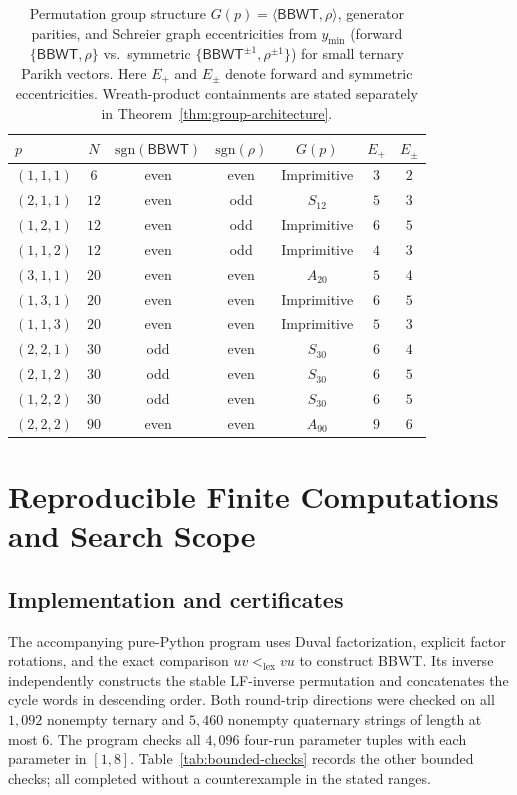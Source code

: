 \documentclass[11pt,a4paper]{article}
\theoremstyle{definition}
\newcommand{\BBWT}{\mathsf{BBWT}}
\newcommand{\sgn}{\mathrm{sgn}}
\newcommand{\lex}{\mathrm{lex}}
\begin{document}
\begin{table}[t]
\centering
\caption{Permutation group structure $G(p) = \langle \BBWT, \rho \rangle$, generator parities, and Schreier graph eccentricities from $y_{\min}$ (forward $\{\BBWT,\rho\}$ vs.\ symmetric $\{\BBWT^{\pm 1}, \rho^{\pm 1}\}$) for small ternary Parikh vectors. Here $E_+$ and $E_{\pm}$ denote forward and symmetric eccentricities. Wreath-product containments are stated separately in Theorem~\ref{thm:group-architecture}.}
\label{tab:group-arch}
\begin{tabular}{@{}lcccccc@{}}
\toprule
$p$ & $N$ & $\sgn(\BBWT)$ & $\sgn(\rho)$ & $G(p)$ & $E_+$ & $E_{\pm}$ \\
\midrule
$(1, 1, 1)$ & $6$ & even & even & Imprimitive & $3$ & $2$ \\
$(2, 1, 1)$ & $12$ & even & odd & $S_{12}$ & $5$ & $3$ \\
$(1, 2, 1)$ & $12$ & even & odd & Imprimitive & $6$ & $5$ \\
$(1, 1, 2)$ & $12$ & even & odd & Imprimitive & $4$ & $3$ \\
$(3, 1, 1)$ & $20$ & even & even & $A_{20}$ & $5$ & $4$ \\
$(1, 3, 1)$ & $20$ & even & even & Imprimitive & $6$ & $5$ \\
$(1, 1, 3)$ & $20$ & even & even & Imprimitive & $5$ & $3$ \\
$(2, 2, 1)$ & $30$ & odd & even & $S_{30}$ & $6$ & $4$ \\
$(2, 1, 2)$ & $30$ & odd & even & $S_{30}$ & $6$ & $5$ \\
$(1, 2, 2)$ & $30$ & odd & even & $S_{30}$ & $6$ & $5$ \\
$(2, 2, 2)$ & $90$ & even & even & $A_{90}$ & $9$ & $6$ \\
\bottomrule
\end{tabular}
\end{table}

\section{Reproducible Finite Computations and Search Scope}
\label{sec:experiments}

\subsection{Implementation and certificates}
The accompanying pure-Python program uses Duval factorization, explicit factor rotations, and the exact comparison $uv<_{\lex}vu$ to construct BBWT. Its inverse independently constructs the stable LF-inverse permutation and concatenates the cycle words in descending order. Both round-trip directions were checked on all $1{,}092$ nonempty ternary and $5{,}460$ nonempty quaternary strings of length at most $6$. The program checks all $4{,}096$ four-run parameter tuples with each parameter in $[1,8]$. Table~\ref{tab:bounded-checks} records the other bounded checks; all completed without a counterexample in the stated ranges.
\end{document}
